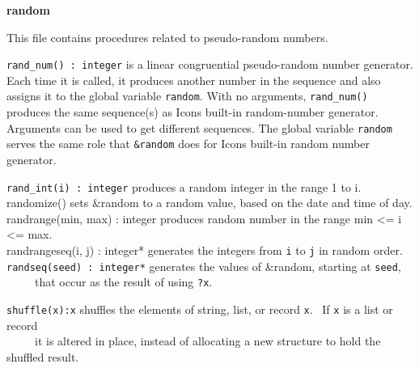 
{\sffamily\bfseries
random}

This file contains procedures related to pseudo-random numbers.

\texttt{rand\_num() : integer} is a linear congruential pseudo-random
number generator. Each time it is called, it produces
another number in the sequence and also assigns it to the global
variable \texttt{random}. With no arguments, \texttt{rand\_num()}
produces the same sequence(s) as Icon{\textquotesingle}s built-in
random-number generator. Arguments can
be used to get different sequences. The global variable \texttt{random}
serves the same role that \texttt{\&random} does for
Icon{\textquotesingle}s built-in random
number generator.

\texttt{rand\_int(i) : integer} produces a random integer in the range 1
to i.\\
randomize() sets \&random to a
{\textquotedbl}random{\textquotedbl} value, based on the date and time
of day. \\
\textsf{randrange(min, max) : integer} produces random number in the
range \textsf{min {\textless}= i {\textless}= max}.\\
\textsf{randrangeseq(i, j) : integer*} generates the integers from
\texttt{i} to \texttt{j} in random order.\\
\texttt{randseq(seed) : integer*} generates the values of \&random,
starting at \texttt{seed},\\
 \ \ \ \ \ that occur as the result of using \texttt{?x}.

\texttt{shuffle(x):x} shuffles the elements of string, list, or record
\texttt{x}. \ If \texttt{x} is a list or record\\
 \ \ \ \ \ it is altered in place, instead of allocating a new structure
to hold the shuffled result.

